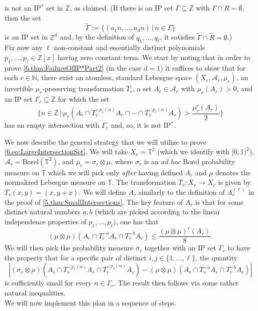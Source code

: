 \documentclass[11pt,american,preprint]{elsarticle}
\numberwithin{equation}{section}
\theoremstyle{plain}
\theoremstyle{plain*}
\theoremstyle{plain}
\theoremstyle{plain*}
\theoremstyle{plain}
\theoremstyle{plain*}
\theoremstyle{remark}
\theoremstyle{remark*}
\theoremstyle{remark}
\theoremstyle{remark*}
\theoremstyle{remark}
\theoremstyle{remark*}
\theoremstyle{plain}
\theoremstyle{definition}
\theoremstyle{plain}
\theoremstyle{plain} %
\newcommand{\N}{\mathbb{N}}
\newcommand{\Z}{\mathbb{Z}}
\begin{document}
is not an IP$^*$ set in $\Z$, as claimed. (If there is an IP set  $\Gamma\subseteq \Z$ with $\Gamma\cap R=\emptyset$, then the set 
$$\tilde\Gamma:=\{(a_1n,...,a_dn)\,|\,n\in\Gamma\}$$
is  an IP set in $\Z^d$ and, by the definition of $q_1,...,q_\ell$, it satisfies $\tilde\Gamma\cap \tilde R=\emptyset$.)
\\
Fix now any $\ell$ non-constant and essentially distinct polynomials $p_1,...,p_\ell\in\Z[x]$ having zero constant term. We start by noting that in order to prove \cref{6.thm:FailureOfIP*Part2} (in the case $d=1$) it suffices to show that  for each $r\in\N$, there exist an atomless, standard Lebesgue space $(X_r,\mathcal A_r,\mu_r)$, an invertible $\mu_r$-preserving transformation $T_r$, a set $A_r\in \mathcal A_r$ with $\mu_r(A_r)>0$, and an IP set $\Gamma_r\subseteq \Z$
    for which the set 
    \begin{equation}\label{6.eq:LargeIntersectionSet}
        \{n\in\Z\,|\, \mu_r(A_r\cap T_r^{-p_1(n)}A_r\cap \cdots\cap T_r^{-p_\ell(n)}A_r)> \frac{\mu_r^r(A_r)}{2}\}
    \end{equation}
    has an empty intersection with $\Gamma_r$ and, so, it is not IP$^*$. 

We now describe the general strategy that we will utilize to prove \eqref{6.eq:LargeIntersectionSet}. We will take $X_r=\mathbb T^2$ (which we identify with $[0,1)^2$), $\mathcal A_r=\text{Borel}(\mathbb T^2)$, and $\mu_r=\sigma_r\otimes\mu$, where $\sigma_r$ is an \textit{ad hoc} Borel probability measure on $\mathbb T$ which we will  pick only \textit{after} having defined $A_r$ and $\mu$ denotes the normalized Lebesgue measure on $\mathbb T$. The transformation $T_r:X_r\rightarrow X_r$ is given by $T_r(x,y)=(x,y+x)$. 
  We will define $A_r$ similarly to the definition of $A^{(\ell)}_r$  in the proof of \cref{5.thm:SmallIntersections}. The key feature of $A_r$ is that for some distinct natural numbers $a,b$ (which are picked according to the linear independence properties of $p_1,...,p_\ell$),  one has that 
  $$
(\mu\otimes\mu)(A_r\cap T_r^{-a}A_r\cap T_r^{-b}A_r)\leq \frac{(\mu\otimes\mu)^{r}(A_r)}{8}.
  $$
We will then pick the probability measure $\sigma_r$ together with an IP set $\Gamma_r$ to have the property that for a specific pair of  distinct $i,j\in\{1,...,\ell\}$, the quantity 
\begin{equation*}\label{8.ErrorInstrategy}
|(\sigma_r\otimes\mu)(A_r\cap T_r^{-p_i(n)}A_r\cap T_r^{-p_j(n)}A_r)-(\mu\otimes\mu)(A_r\cap T_r^{-a}A_r\cap T_r^{-b}A_r)|
\end{equation*}
is sufficiently small for every $n\in \Gamma_r$. The result then follows via some rather natural inequalities. \\ 
We will now implement this plan in a sequence of steps.\\
    
\end{document}
